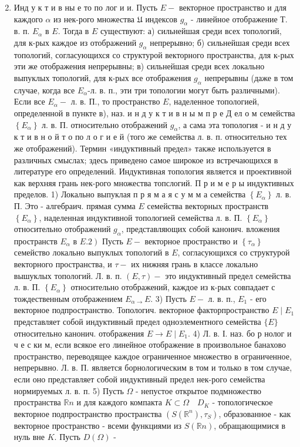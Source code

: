 \documentclass[10pt]{article}
\begin{document}
\begin{enumerate}

  \setcounter{enumi}{1}

  \item Инд у к т и в ны е то по лог и и. Пусть $E-$ векторное пространство и для каждого $\alpha$ из нек-рого множества $\mathfrak{U}$ индексов $g_{\alpha}$ - линейное отображение Т. в. п. $E_{\alpha}$ в $E$. Тогда в $E$ существуют: а) сильнейшая среди всех топологий, для к-рых каждое из отображений $g_{\alpha}$ непрерывно; б) сильнейшая среди всех топологий, согласующихся со структурой векторного пространства, для к-рых эти же отображения непрерывны; в) сильнейшая среди всех локально выпуклых топологий, для к-рых все отображения $g_{\alpha}$ непрерывны (даже в том случае, когда все $E_{\alpha}$-л. в. п., эти три топологии могут быть различными). Если все $E_{\alpha}-$ л. в. П., то пространство $E$, наделенное топологией, определенной в пункте в), наз. и н д у к т и в н ы м п р е Д ел о м семейства $\left\{E_{\alpha}\right\}$ л. в. П. относительно отображений $g_{\alpha}$, а сама эта топология - и н д у к т и в н о й т о по л о г и е й (того же семейства л. в. п. относительно тех же отображений). Термин «индуктивный предел» также используется в различных смыслах; здесь приведено самое широкое из встречающихся в литературе его определений. Индуктивная топология является и проективной как верхняя грань нек-рого множества топслогий. П р и м е р ы индуктивных пределов. 1) Локально выпуклая п р я м а я с у м м а семейства $\left\{E_{\alpha}\right\}$ л. в. П. Это - алгебраич. прямая сумма $E$ семейства векторных пространств $\left\{E_{\alpha}\right\}$, наделенная индуктивной топологией семейства л. в. П. $\left\{E_{\alpha}\right\}$ относительно отображений $g_{\alpha}$, представляющих собой канонич. вложения пространств $E_{\alpha}$ в $\left.E .2\right)$ Пусть $E-$ векторное пространство и $\left\{\tau_{\alpha}\right\}$ семейство локально выпуклых топологий в $E$, согласующихся со структурой векторного пространства, и $\tau-$ их нижняя грань в классе локально вышуклых топологий. Л. в. п. $(E, \tau)-$ это индуктивный предел семейства л. в. П. $\left\{E_{\alpha}\right\}$ относительно отображений, каждое из к-рых совпадает с тождественным отображением $E_{\alpha \rightarrow} E$. 3) Пусть $E-$ л. в. п., $E_{1}$ - его векторное подпространство. Топологич. векторное факторпространство $E \mid E_{1}$ представляет собой индуктивный предел одноэлементного семейства $\{E\}$ относительно канонич. отображения $E \rightarrow E \mid E_{1}$. 4) Л. в. І. наз. бо р нолог и ч е с ки м, если всякое его линейное отображение в произвольное банахово пространство, переводящее каждое ограниченное множество в ограниченное, непрерывно. Л. в. П. является борнологическим в том и только в том случае, если оно представляет собой индуктивный предел нек-рого семейства нормируемых л. в. п. 5) Пусть $\Omega$ - непустое открытое подмножество пространства $\mathbb{R} n$ и для каждого компакта $K \subset \Omega \quad D_{K}$ - топологическое векторное подпространство пространства $\left(S\left(\mathbb{R}^{n}\right), \tau_{S}\right)$, образованное - как векторное пространство - всеми функциями из $S(\mathbb{R} n)$, обращающимися в нуль вне $K$. Пусть $D(\Omega)$ - 
\end{enumerate}
\end{document}

